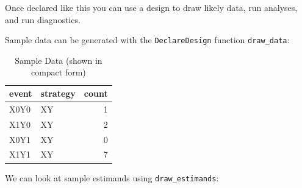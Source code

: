 \documentclass[12pt,]{book}
\newenvironment{Shaded}{\begin{snugshade}}{\end{snugshade}}
\newcommand{\DataTypeTok}[1]{\textcolor[rgb]{0.13,0.29,0.53}{#1}}
\newcommand{\DecValTok}[1]{\textcolor[rgb]{0.00,0.00,0.81}{#1}}
\newcommand{\FloatTok}[1]{\textcolor[rgb]{0.00,0.00,0.81}{#1}}
\newcommand{\KeywordTok}[1]{\textcolor[rgb]{0.13,0.29,0.53}{\textbf{#1}}}
\newcommand{\NormalTok}[1]{#1}
\newcommand{\OperatorTok}[1]{\textcolor[rgb]{0.81,0.36,0.00}{\textbf{#1}}}
\newcommand{\StringTok}[1]{\textcolor[rgb]{0.31,0.60,0.02}{#1}}
\begin{document}
\begin{Shaded}
\end{Shaded}

Once declared like this you can use a design to draw likely data, run analyses, and run diagnostics.

Sample data can be generated with the \texttt{DeclareDesign} function \texttt{draw\_data}:

\begin{table}[t]

\caption{\label{tab:unnamed-chunk-53}Sample Data (shown in compact form)}
\centering
\begin{tabular}{l|l|r}
\hline
event & strategy & count\\
\hline
X0Y0 & XY & 1\\
\hline
X1Y0 & XY & 2\\
\hline
X0Y1 & XY & 0\\
\hline
X1Y1 & XY & 7\\
\hline
\end{tabular}
\end{table}

We can look at sample estimands using \texttt{draw\_estimands}:
\end{document}
